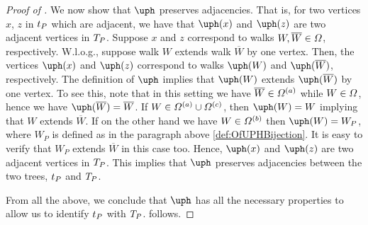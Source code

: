 \documentclass[11pt,reqno]{amsart}
\numberwithin{equation}{section}
\newcommand{\blue}[1]{{\color{blue}#1}}
\newcommand{\cadmiumgreen}[1]{{\color{cadmiumgreen}#1}}
\newcommand{\goldenbrown}[1]{{\color{goldenbrown}#1}}
\newcommand{\heliotrope}[1]{{\color{heliotrope}#1}}
\renewcommand{\blue}[1]{#1}
\renewcommand{\cadmiumgreen}[1]{#1}
\renewcommand{\goldenbrown}[1]{#1}
\renewcommand{\heliotrope}[1]{#1}
\newcommand{\kP}{\goldenbrown{P}}
\newcommand{\kW}{\blue{W}}
\newcommand{\kx}{\heliotrope{x}}
\newcommand{\kz}{\cadmiumgreen{z}}
\renewcommand{\kP}{P}
\renewcommand{\kW}{W}
\renewcommand{\kx}{x}
\renewcommand{\kz}{z}
\begin{document}
\begin{proof}[Proof of ]
We now show that $\ABijection$ preserves adjacencies. That is, for two vertices $\kx$, $\kz$ in $\STw_{\kP}$
which are adjacent, we have that $\ABijection(\kx)$ and $\ABijection(\kz)$ are two  adjacent vertices in $\XTPw$. 
Suppose  $\kx$ and $\kz$ correspond to walks $\kW, \overline{\kW}\in \sawpaths$, respectively. W.l.o.g., 
suppose  walk $ \kW$ extends walk $\overline{\kW}$ by  one vertex. Then, the vertices  $\ABijection(\kx)$ 
and $\ABijection(\kz)$ correspond to walks $\ABijection(\kW)$ and $\ABijection(\overline{\kW})$, respectively. 
The definition of $\ABijection$ implies that $\ABijection(\kW)$ extends  $\ABijection(\overline{\kW})$ by one 
vertex.  To see this,  note that in this setting we have $\overline{\kW}\in \sawpaths^{(a)}$ while $\kW\in \sawpaths$, 
hence we have $\ABijection(\overline{\kW})=\overline{\kW}$. If $\kW\in \sawpaths^{(a)}\cup \sawpaths^{(c)}$,  then 
$\ABijection(\kW)=\kW$ implying that $\kW$ extends $\overline{\kW}$. If on the other hand
we have $\kW\in \sawpaths^{(b)}$ then  $\ABijection(\kW)=\kW_{\kP}$, where $\kW_{\kP}$ is defined as in
the paragraph above \eqref{def:OfUPHBijection}. It is easy to verify  that $\kW_{\kP}$ extends $\overline{\kW}$ in this case too. 
Hence, $\ABijection(\kx)$ and $\ABijection(\kz)$ are  two  adjacent vertices in  $\XTPw$. This implies that  
$\ABijection$ preserves adjacencies between the two trees,   $\STw_{\kP}$ and $\XTPw$.





From all the above, we conclude that $\ABijection$ has all the necessary properties to allow us to identify 
$\STw_{\kP}$ with $\XTPw$.    follows. 
\end{proof}
\end{document}
